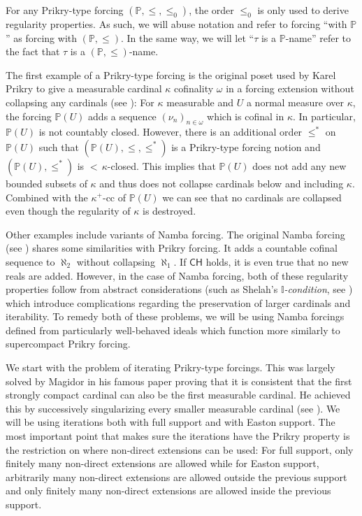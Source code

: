 \documentclass[a4paper]{amsart}
\theoremstyle{definition}
\theoremstyle{remark}
\theoremstyle{plain}
\numberwithin{mydef}{section}
\newcommand{\dI}{\mathbb{I}}
\newcommand{\dP}{\mathbb{P}}
\newcommand{\CH}{\mathsf{CH}}
\begin{document}
	For any Prikry-type forcing $(\dP,\leq,\leq_0)$, the order $\leq_0$ is only used to derive regularity properties. As such, we will abuse notation and refer to forcing ``with $\dP$'' as forcing with $(\dP,\leq)$. In the same way, we will let ``$\tau$ is a $\dP$-name'' refer to the fact that $\tau$ is a $(\dP,\leq)$-name.
	
	The first example of a Prikry-type forcing is the original poset used by Karel Prikry to give a measurable cardinal $\kappa$ cofinality $\omega$ in a forcing extension without collapsing any cardinals (see \cite{PrikryOriginal}): For $\kappa$ measurable and $U$ a normal measure over $\kappa$, the forcing $\dP(U)$ adds a sequence $(\nu_n)_{n\in\omega}$ which is cofinal in $\kappa$. In particular, $\dP(U)$ is not countably closed. However, there is an additional order $\leq^*$ on $\dP(U)$ such that $(\dP(U),\leq,\leq^*)$ is a Prikry-type forcing notion and $(\dP(U),\leq^*)$ is ${<}\,\kappa$-closed. This implies that $\dP(U)$ does not add any new bounded subsets of $\kappa$ and thus does not collapse cardinals below and including $\kappa$. Combined with the $\kappa^+$-cc of $\dP(U)$ we can see that no cardinals are collapsed even though the regularity of $\kappa$ is destroyed.
	
	Other examples include variants of Namba forcing. The original Namba forcing (see \cite{BukovskyCoplakovaMinimal}) shares some similarities with Prikry forcing. It adds a countable cofinal sequence to $\aleph_2$ without collapsing $\aleph_1$. If $\CH$ holds, it is even true that no new reals are added. However, in the case of Namba forcing, both of these regularity properties follow from abstract considerations (such as Shelah's \emph{$\dI$-condition}, see \cite[Chapter XI]{ShelahProperImproper}) which introduce complications regarding the preservation of larger cardinals and iterability. To remedy both of these problems, we will be using Namba forcings defined from particularly well-behaved ideals which function more similarly to supercompact Prikry forcing.
	
	We start with the problem of iterating Prikry-type forcings. This was largely solved by Magidor in his famous paper proving that it is consistent that the first strongly compact cardinal can also be the first measurable cardinal. He achieved this by successively singularizing every smaller measurable cardinal (see \cite{MagidorIdentityCrises}). We will be using iterations both with full support and with Easton support. The most important point that makes sure the iterations have the Prikry property is the restriction on where non-direct extensions can be used: For full support, only finitely many non-direct extensions are allowed while for Easton support, arbitrarily many non-direct extensions are allowed outside the previous support and only finitely many non-direct extensions are allowed inside the previous support.
	
\end{document}
